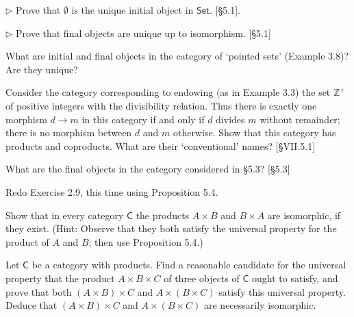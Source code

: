 \begin{problem}
  \def \Set {\mathsf{Set}}
  $\rhd$ Prove that $\emptyset$ is the unique initial object in $\Set$.
  [\S 5.1].
\end{problem}

\begin{problem}
  $\rhd$ Prove that final objects are unique up to isomorphism. [\S 5.1]
\end{problem}

\begin{problem}
  What are initial and final objects in the category of `pointed sets'
  (Example 3.8)? Are they unique?
\end{problem}

\begin{problem}
  Consider the category corresponding to endowing (as in Example 3.3) the set
  $\mathbb{Z}^+$ of positive integers with the divisibility relation. Thus
  there is exactly one morphism $d\to m$ in this category if and only if $d$
  divides $m$ without remainder; there is no morphism between $d$ and $m$
  otherwise. Show that this category has products and coproducts. What are
  their `conventional' names? [\S VII.5.1]
\end{problem}

\begin{problem}
  What are the final objects in the category considered in \S5.3? [\S5.3]
\end{problem}

\begin{problem}
  Redo Exercise 2.9, this time using Proposition 5.4.
\end{problem}

\begin{problem}
  \def \C {\mathsf{C}}
  Show that in every category $\C$ the products $A\times B$ and $B\times A$ are
  isomorphic, if they exist. (Hint: Observe that they both satisfy the universal
  property for the product of $A$ and $B$; then use Proposition 5.4.)
\end{problem}

\begin{problem}
  \def \C {\mathsf{C}}
  Let $\C$ be a category with products. Find a reasonable candidate for the
  universal property that the product $A\times B\times C$ of three objects of $\C$
  ought to satisfy, and prove that both $(A\times B)\times C$ and $A\times
  (B\times C)$ satisfy this universal property. Deduce that $(A\times B)\times C$
  and $A\times (B\times C)$ are necessarily isomorphic.
\end{problem}

